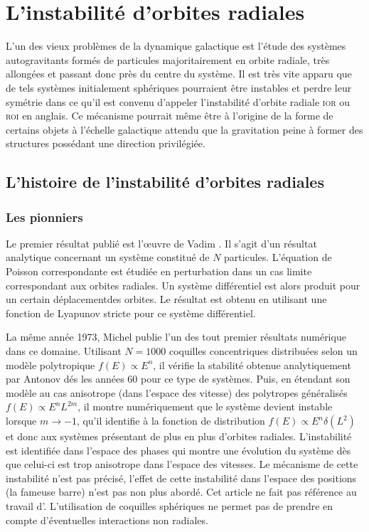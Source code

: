 \section{L'instabilité d'orbites radiales}

L'un des vieux problèmes de la dynamique galactique est l'étude des systèmes autogravitants formés de particules majoritairement en orbite radiale,
très allongées et passant donc près du centre du système. Il est très vite apparu que de tels systèmes initialement sphériques pourraient être
instables et perdre leur symétrie dans ce qu'il est convenu d'appeler l'instabilité d'orbite radiale \textsc{ior} ou \textsc{roi} en anglais. Ce
mécanisme pourrait même être à l'origine de la forme de certains objets à l'échelle galactique attendu que la gravitation peine à former des
structures possédant une direction privilégiée.


\subsection{L'histoire de l'instabilité d'orbites radiales}

\subsubsection{Les pionniers}

Le premier résultat publié est l'œuvre de Vadim \cite{antonov}. Il s'agit d'un résultat analytique concernant un système constitué de $N$ particules.
L'équation de Poisson correspondante est étudiée en perturbation dans un cas limite correspondant aux orbites radiales. Un système différentiel est
alors produit pour un certain \og déplacement\fg des orbites. Le résultat est obtenu en utilisant une fonction de Lyapunov stricte pour ce système
différentiel.

La même année 1973, Michel \cite{henon} publie l'un des tout premier résultats numérique dans ce domaine. Utilisant $N=1000$ coquilles concentriques
distribuées selon un modèle polytropique $f\left(  E\right)  \propto E^{n}$, il vérifie la stabilité obtenue analytiquement par Antonov dés les années
60 pour ce type de systèmes. Puis, en étendant son modèle au cas anisotrope (dans l'espace des vitesse) des polytropes généralisés  $f\left(  E\right)
\propto E^{n}L^{2m}$, il montre numériquement que le système devient instable lorsque $m\rightarrow-1$, qu'il identifie à la fonction de distribution
$f\left(  E\right)  \propto E^{n}\delta\left(  L^{2}\right) $ et donc aux systèmes présentant de plus en plus d'orbites radiales. L'instabilité est
identifiée dans l'espace des phases qui montre une évolution du système dès que celui-ci est trop anisotrope dans l'espace des vitesses. Le mécanisme
de cette instabilité n'est pas précisé, l'effet de cette instabilité dans l'espace des positions (la fameuse barre) n'est pas non plus abordé. Cet
article ne fait pas référence au travail d'\cite{antonov}. L'utilisation de coquilles sphériques ne permet pas de prendre en compte d'éventuelles
interactions non radiales.

